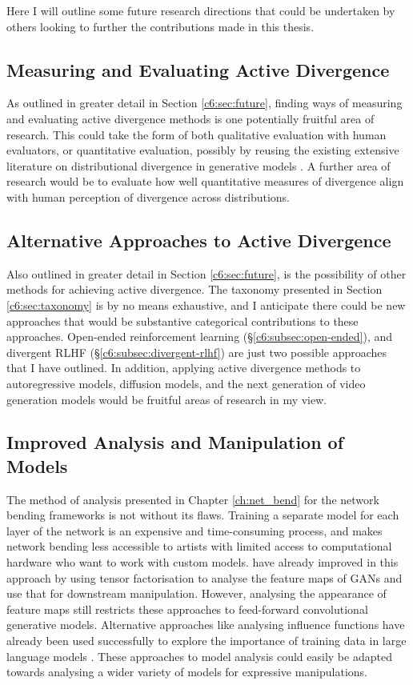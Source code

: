 Here I will outline some future research directions that could be undertaken by others looking to further the contributions made in this thesis.

\subsection{Measuring and Evaluating Active Divergence}
As outlined in greater detail in Section \ref{c6:sec:future}, finding ways of measuring and evaluating active divergence methods is one potentially fruitful area of research.
This could take the form of both qualitative evaluation with human evaluators, or quantitative evaluation, possibly by reusing the existing extensive literature on distributional divergence in generative models \citep{gretton2019interpretable}.
A further area of research would be to evaluate how well quantitative measures of divergence align with human perception of divergence across distributions.

\subsection{Alternative Approaches to Active Divergence}
Also outlined in greater detail in Section \ref{c6:sec:future}, is the possibility of other methods for achieving active divergence. 
The taxonomy presented in Section \ref{c6:sec:taxonomy} is by no means exhaustive, and I anticipate there could be new approaches that would be substantive categorical contributions to these approaches. 
Open-ended reinforcement learning (\S \ref{c6:subsec:open-ended}), and divergent RLHF (\S \ref{c6:subsec:divergent-rlhf}) are just two possible approaches that I have outlined. 
In addition, applying active divergence methods to autoregressive models, diffusion models, and the next generation of video generation models would be fruitful areas of research in my view.

\subsection{Improved Analysis and Manipulation of Models}

The method of analysis presented in Chapter \ref{ch:net_bend} for the network bending frameworks is not without its flaws.
Training a separate model for each layer of the network is an expensive and time-consuming process, and makes network bending less accessible to artists with limited access to computational hardware who want to work with custom models.
\cite{oldfield2022panda,oldfield2024bilinear} have already improved in this approach by using tensor factorisation to analyse the feature maps of GANs and use that for downstream manipulation.
However, analysing the appearance of feature maps still restricts these approaches to feed-forward convolutional generative models.
Alternative approaches like analysing influence functions \citep{koh2017understanding} have already been used successfully to explore the importance of training data in large language models \citep{choe2024your}.
These approaches to model analysis could easily be adapted towards analysing a wider variety of models for expressive manipulations.

